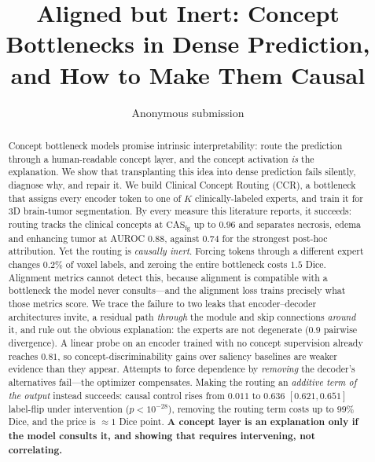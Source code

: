 \documentclass[runningheads]{llncs}
\newcommand{\casfg}{\mathrm{CAS}_{\mathrm{fg}}}
\newcounter{pend}
\begin{document}
\title{Aligned but Inert: Concept Bottlenecks in Dense Prediction,\\
       and How to Make Them Causal}
\author{Anonymous submission}
\maketitle

\begin{abstract}
Concept bottleneck models promise intrinsic interpretability: route the prediction through a
human-readable concept layer, and the concept activation \emph{is} the explanation. We show
that transplanting this idea into dense prediction fails silently, diagnose why, and repair
it. We build Clinical Concept Routing (CCR), a bottleneck that assigns every encoder token to
one of $K$ clinically-labeled experts, and train it for 3D brain-tumor segmentation. By every
measure this literature reports, it succeeds: routing tracks the clinical concepts at
$\casfg$ up to $0.96$ and separates necrosis, edema and enhancing tumor at AUROC $0.88$,
against $0.74$ for the strongest post-hoc attribution. Yet the routing is \emph{causally
inert}. Forcing tokens through a different expert changes $0.2\%$ of voxel labels, and
zeroing the entire bottleneck costs $1.5$ Dice. Alignment metrics cannot detect this, because
alignment is compatible with a bottleneck the model never consults---and the alignment loss
trains precisely what those metrics score. We trace the failure to two leaks that
encoder--decoder architectures invite, a residual path \emph{through} the module and skip
connections \emph{around} it, and rule out the obvious explanation: the experts are not
degenerate ($0.9$ pairwise divergence). A linear probe on an encoder trained with no concept
supervision already reaches $0.81$, so concept-discriminability gains over saliency baselines
are weaker evidence than they appear. Attempts to force dependence by \emph{removing} the
decoder's alternatives fail---the optimizer compensates. Making the routing an \emph{additive
term of the output} instead succeeds: causal control rises from $0.011$ to $\mathbf{0.636}$
$[0.621,0.651]$ label-flip under intervention ($p{<}10^{-28}$), removing the routing term
costs up to $99\%$ Dice, and the price is $\approx1$ Dice point. \textbf{A concept layer is an
explanation only if the model consults it, and showing that requires intervening, not
correlating.}
\end{abstract}
\end{document}
